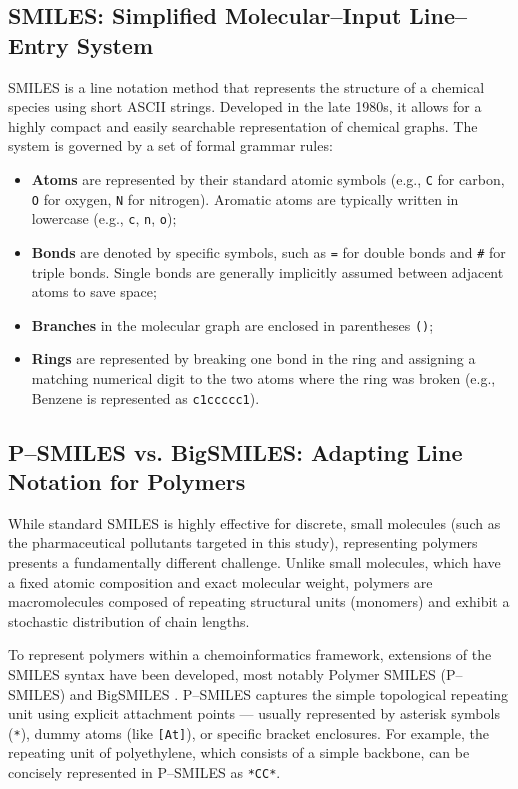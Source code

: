 \subsection*{SMILES: Simplified Molecular--Input Line--Entry System}
SMILES is a line notation method that represents the structure of a chemical species using short ASCII strings. Developed in the late 1980s, it allows for a highly compact and easily searchable representation of chemical graphs. The system is governed by a set of formal grammar rules:
\begin{itemize}
	\item \textbf{Atoms} are represented by their standard atomic symbols (e.g., \texttt{C} for carbon, \texttt{O} for oxygen, \texttt{N} for nitrogen). Aromatic atoms are typically written in lowercase (e.g., \texttt{c}, \texttt{n}, \texttt{o});
	\item \textbf{Bonds} are denoted by specific symbols, such as \texttt{=} for double bonds and \texttt{\#} for triple bonds. Single bonds are generally implicitly assumed between adjacent atoms to save space;
	\item \textbf{Branches} in the molecular graph are enclosed in parentheses \texttt{()};
	\item \textbf{Rings} are represented by breaking one bond in the ring and assigning a matching numerical digit to the two atoms where the ring was broken (e.g., Benzene is represented as \texttt{c1ccccc1}).
\end{itemize}

\subsection*{P--SMILES vs. BigSMILES: Adapting Line Notation for Polymers}
While standard SMILES is highly effective for discrete, small molecules (such as the pharmaceutical pollutants targeted in this study), representing polymers presents a fundamentally different challenge. Unlike small molecules, which have a fixed atomic composition and exact molecular weight, polymers are macromolecules composed of repeating structural units (monomers) and exhibit a stochastic distribution of chain lengths.

To represent polymers within a chemoinformatics framework, extensions of the SMILES syntax have been developed, most notably Polymer SMILES (P--SMILES) and BigSMILES \cite{lin2019bigsmiles}. P--SMILES captures the simple topological repeating unit using explicit attachment points — usually represented by asterisk symbols (\texttt{*}), dummy atoms (like \texttt{[At]}), or specific bracket enclosures. For example, the repeating unit of polyethylene, which consists of a simple  backbone, can be concisely represented in P--SMILES as \texttt{*CC*}.

